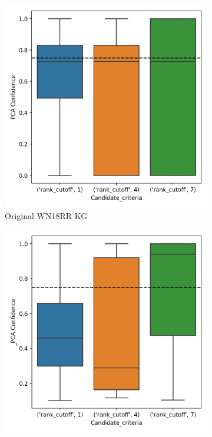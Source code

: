 \begin{figure}[!htb]
\centering
\begin{subfigure}{.5\textwidth}
  \centering
  \includegraphics[width=1\linewidth]{figures/results/ranks/PCA-rank_wn18rr.png}
  \caption{Original WN18RR KG}
  \label{fig:PCA-rank_wn18rr_boxplot_sub}
\end{subfigure}%
\begin{subfigure}{.5\textwidth}
  \centering
  \includegraphics[width=1\linewidth]{figures/results/ranks/_PCA-rank_wn18rr.png}

\end{subfigure}
\end{figure}
